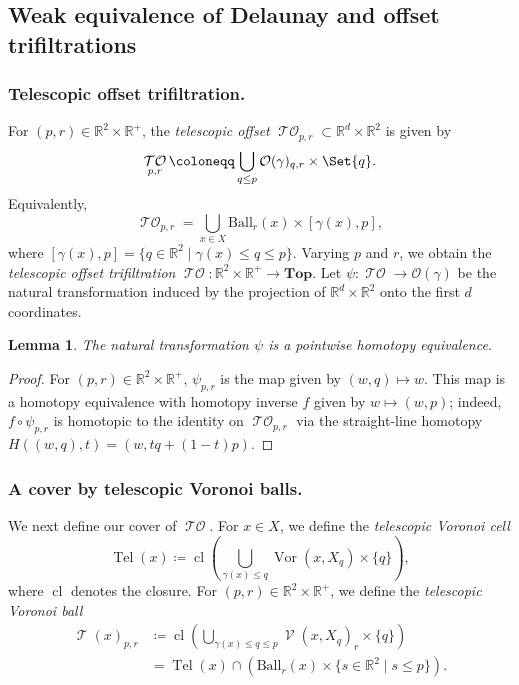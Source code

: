 \documentclass[11pt]{amsart}
\newcommand{\R}{\mathbb{R}} %
\newcommand{\Ball}{\text{Ball}}
\DeclareMathOperator{\V}{\mathcal{V}}
\DeclareMathOperator{\Vor}{Vor}
\DeclareMathOperator{\Tel}{Tel}
\DeclareMathOperator{\TelVor}{\mathcal{T}}
\DeclareMathOperator{\TelOffset}{\mathcal{TO}}
\newcommand{\Top}{\textbf{Top}}
\newcommand{\deff}{\emph}
\newcommand{\Offset}[0]{\mathcal{O}}
\renewcommand{\subparagraph}[1]{\subsubsection*{\textbf{\textup{#1}}}}
\theoremstyle{plain}
\newtheorem{lemma}[theorem]{Lemma}
\newtheorem{proposition}[theorem]{Proposition}
\theoremstyle{definition}
\theoremstyle{remark}
\begin{document}
\subsection{Weak equivalence of Delaunay and offset trifiltrations}
%
\subparagraph{Telescopic offset trifiltration.} For $(p,r)\in\R^{2}\times \R^+$, the \deff{telescopic offset} $\TelOffset_{p,r} \subset \R^{d}\times \R^2$ is given by
\begin{equation}
  \TelOffset_{p,r} \coloneqq \bigcup_{q\leq p} \Offset(\gamma)_{q,r} \times \Set{q}.
\end{equation}
Equivalently, \[\TelOffset_{p,r}= \bigcup_{x\in X} \Ball_r(x)\times [\gamma(x),p],\] where $ [\gamma(x),p]=\{q\in \R^2\mid \gamma(x)\leq q\leq p\}$.  Varying $p$ and $r$, we obtain the \deff{telescopic offset trifiltration}
$\TelOffset\colon \R^{2}\times\R^{+} \to \Top$.  %
Let $\psi\colon \TelOffset\to \Offset(\gamma)$ be the natural transformation induced by the projection of $\R^d\times \R^2$ onto the first $d$ coordinates. 
\begin{lemma}\label{prop:teloffset}
The natural transformation $\psi$ is a pointwise homotopy equivalence.
\end{lemma}
\begin{proof}
For $(p,r)\in \R^2\times \R^+$, $\psi_{p,r}$ is the map given by $(w,q)\mapsto w$.  This map is a homotopy equivalence with homotopy inverse $f$ given by $w\mapsto (w,p)$; indeed, $f \circ \psi_{p,r}$ is homotopic to the identity on $\TelOffset_{p,r}$ via the straight-line homotopy $H((w,q),t)=(w,tq+(1-t)p)$.
\end{proof}
%
%
\subparagraph{A cover by telescopic Voronoi balls.}
We next define our cover of $\TelOffset$.  %
For $x\in X$, we define the \deff{telescopic Voronoi cell} 
\[
  \Tel(x) \coloneqq \operatorname{cl}(\bigcup\limits_{ \gamma(x)\leq q} {\Vor(x, X_{q}) \times \{q\}}),
\]
where $\operatorname{cl}$ denotes the closure.  %
For $(p,r)\in \R^2\times \R^+$, we define the \deff{telescopic Voronoi ball} 
 \begin{align*}
  \TelVor(x)_{p,r} &\coloneqq \operatorname{cl}(\bigcup\limits_{ \gamma(x)\leq q\leq p} {\V(x, X_{q})_r \times \{q\}})\\
 &=  \Tel(x) \cap (\Ball_r(x)\times \{s\in \R^2\mid s\leq p\}).
 \end{align*}
\end{document}
